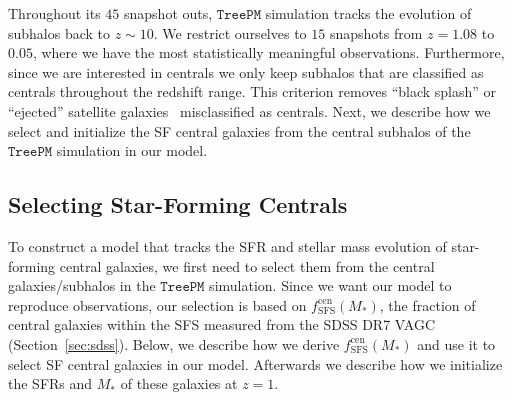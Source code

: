 \documentclass[12pt, letterpaper, preprint, tighten]{aastex62}
\begin{document}
Throughout its $45$ snapshot outs, $\mathtt{TreePM}$ simulation tracks
the evolution of subhalos back to $z \sim 10$. We restrict ourselves to $15$
snapshots from $z = 1.08$ to $0.05$, where we have the most statistically
meaningful observations. Furthermore, since we are interested in centrals we only
keep subhalos that are classified as centrals throughout the redshift
range. This criterion removes ``black splash'' or ``ejected'' satellite
galaxies~\citep[\emph{e.g.}][]{mamon2004,wetzel2014} misclassified as
centrals. Next, we describe how we select and initialize the SF central
galaxies from the central subhalos of the $\mathtt{TreePM}$
simulation in our model.

\subsection{Selecting Star-Forming Centrals}  \label{sec:sfcen}
To construct a model that tracks the SFR and stellar mass evolution of
star-forming central galaxies, we first need to select them from the
central galaxies/subhalos in the $\mathtt{TreePM}$ simulation. Since
we want our model to reproduce observations, our selection is based
on $f^\mathrm{cen}_\mathrm{SFS}(M_*)$, the fraction of central galaxies
within the SFS measured from the SDSS DR7 VAGC (Section~\ref{sec:sdss}).
Below, we describe how we derive $f^\mathrm{cen}_\mathrm{SFS}(M_*)$ and
use it to select SF central galaxies in our model. Afterwards
we describe how we initialize the SFRs and $M_*$ of these galaxies at
$z = 1$.
\end{document}
